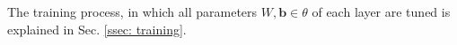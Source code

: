 

        The training process, in which all parameters $W, \mathbf{b} \in \theta$ of each layer are tuned is explained in Sec. \ref{ssec: training}.

